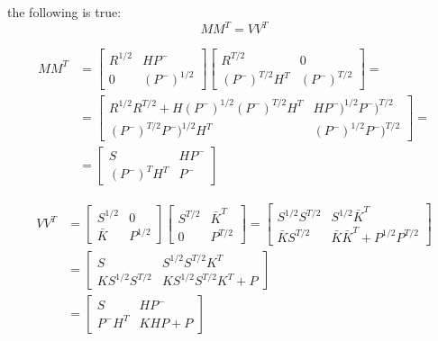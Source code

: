 \documentclass{article}
\begin{document}
the following is true:
\begin{equation}\label{update_SR_mult}
    MM^T = VV^T
\end{equation}

\begin{equation}
\begin{split}
    MM^T &= \begin{bmatrix} R^{1/2} & HP^- \\ 0 & (P^-)^{1/2} \end{bmatrix}\begin{bmatrix} R^{T/2} & 0 \\ (P^-)^{T/2}H^T & (P^-)^{T/2} \end{bmatrix}= \\
    &=\begin{bmatrix} R^{1/2}R^{T/2} + H(P^-)^{1/2}(P^-)^{T/2}H^T & HP^-)^{1/2}P^-)^{T/2} \\ (P^-)^{T/2}P^-)^{1/2}H^T & (P^-)^{1/2}P^-)^{T/2} \end{bmatrix} = \\
    &=\begin{bmatrix}S & HP^- \\ (P^-)^TH^T & P^- \end{bmatrix}
\end{split}
\end{equation}

\begin{equation}
\begin{split}
    VV^T & = \begin{bmatrix} S^{1/2} & 0 \\ \bar{K} & P^{1/2} \end{bmatrix}\begin{bmatrix} S^{T/2} & \bar{K}^T \\ 0 & P^{T/2} \end{bmatrix} = \begin{bmatrix} S^{1/2}S^{T/2} & S^{1/2}\bar{K}^T \\ \bar{K}S^{T/2} & \bar{K}\bar{K}^T + P^{1/2}P^{T/2} \end{bmatrix}\\
     & = \begin{bmatrix} S & S^{1/2}S^{T/2}K^T \\ KS^{1/2}S^{T/2} & KS^{1/2}S^{T/2}K^T + P\end{bmatrix} \\
     & = \begin{bmatrix} S & HP^- \\ P^-H^T & KHP + P\end{bmatrix} \\
\end{split}
\end{equation}
\end{document}
